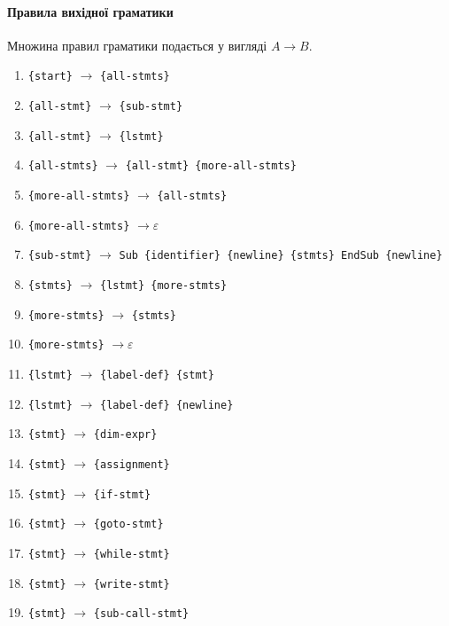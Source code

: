 \documentclass[a4paper,12pt,notitlepage,pdftex]{scrreprt}
\begin{document}
        \paragraph{Правила вихідної граматики}
        \label{para:rules}
            Множина правил граматики подається у вигляді $ A \rightarrow B$.
            \begin{enumerate}
                \item \verb'{start}' $\rightarrow$ \verb'{all-stmts}'
                \item \verb'{all-stmt}' $\rightarrow$ \verb'{sub-stmt}'
                \item \verb'{all-stmt}' $\rightarrow$ \verb'{lstmt}'
                \item \verb'{all-stmts}' $\rightarrow$ \verb'{all-stmt} {more-all-stmts}'
                \item \verb'{more-all-stmts}' $\rightarrow$ \verb'{all-stmts}'
                \item \verb'{more-all-stmts}' $\rightarrow \varepsilon$
                \item \verb'{sub-stmt}' $\rightarrow$ \verb'Sub {identifier} {newline} {stmts} EndSub {newline}'
                \item \verb'{stmts}' $\rightarrow$ \verb'{lstmt} {more-stmts}'
                \item \verb'{more-stmts}' $\rightarrow$ \verb'{stmts}'
                \item \verb'{more-stmts}' $\rightarrow \varepsilon$
                \item \verb'{lstmt}' $\rightarrow$ \verb'{label-def} {stmt}'
                \item \verb'{lstmt}' $\rightarrow$ \verb'{label-def} {newline}'
                \item \verb'{stmt}' $\rightarrow$ \verb'{dim-expr}'
                \item \verb'{stmt}' $\rightarrow$ \verb'{assignment}'
                \item \verb'{stmt}' $\rightarrow$ \verb'{if-stmt}'
                \item \verb'{stmt}' $\rightarrow$ \verb'{goto-stmt}'
                \item \verb'{stmt}' $\rightarrow$ \verb'{while-stmt}'
                \item \verb'{stmt}' $\rightarrow$ \verb'{write-stmt}'
                \item \verb'{stmt}' $\rightarrow$ \verb'{sub-call-stmt}'

\end{enumerate}
\end{document}
